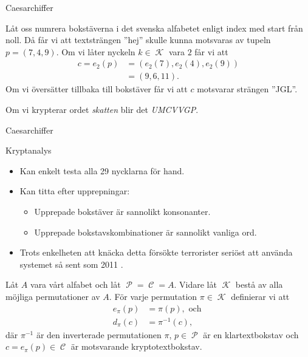 \documentclass{beamer}
\theoremstyle{definition}
\DeclareMathOperator{\p}{\mathcal{P}}
\let\P\p
\DeclareMathOperator{\C}{\mathcal{C}}
\DeclareMathOperator{\K}{\mathcal{K}}
\let\stoch\mathbf
\renewcommand{\p}{\stoch P}
\begin{document}
\begin{frame}{\insertsubsectionhead}{Caesarchiffer}
  \begin{example}\label{ex:shiftdef}
    Låt oss numrera bokstäverna i det svenska alfabetet enligt index med start 
    från noll.
    Då får vi att textsträngen ''hej'' skulle kunna motsvaras av tupeln \(p 
    = (7, 4, 9)\).
    Om vi låter nyckeln \(k\in \K\) vara \(2\) får vi att
    \begin{align}
      \nonumber
      c = e_2(p) &= (e_2(7), e_2(4), e_2(9)) \\
      \nonumber
        &= (9, 6, 11).
    \end{align}
    Om vi översätter tillbaka till bokstäver får vi att \(c\) motsvarar 
    strängen ''JGL''.
  \end{example}
  \begin{example}
    \label{ex:CaesarSkatten}
    Om vi krypterar ordet \emph{skatten} blir det \emph{UMCVVGP}.
  \end{example}
\end{frame}

\begin{frame}{\insertsubsectionhead}{Caesarchiffer}
  \begin{block}{Kryptanalys}
    \begin{itemize}
      \item Kan enkelt testa alla 29 nycklarna för hand.
      \item Kan titta efter upprepningar:
        \begin{itemize}
          \item Upprepade bokstäver är sannolikt konsonanter.
          \item Upprepade bokstavskombinationer är sannolikt vanliga ord.
        \end{itemize}
      \item Trots enkelheten att knäcka detta försökte terrorister seriöst att 
        använda systemet så sent som 2011 \cite{Register2011bjr}.
    \end{itemize}
  \end{block}
\end{frame}

\begin{frame}{\insertsubsectionhead}
  \begin{definition}[Substitutionschiffer]\label{def:substitutionCipher}
    Låt \(A\) vara vårt alfabet och låt \(\P = \C = A\).
    Vidare låt \(\K\) bestå av alla möjliga permutationer av \(A\).
    För varje permutation \(\pi\in \K\) definierar vi att
    \begin{align}
      \nonumber
      e_\pi(p) &= \pi(p), \text{ och } \\
      \nonumber
      d_\pi(c) &= \pi^{-1}(c),
    \end{align}
    där \(\pi^{-1}\) är den inverterade permutationen \(\pi\), \(p\in \P\) är 
    en klartextbokstav och \(c = e_\pi(p)\in \C\) är motsvarande 
    kryptotextbokstav.
  \end{definition}
\end{frame}
\end{document}

